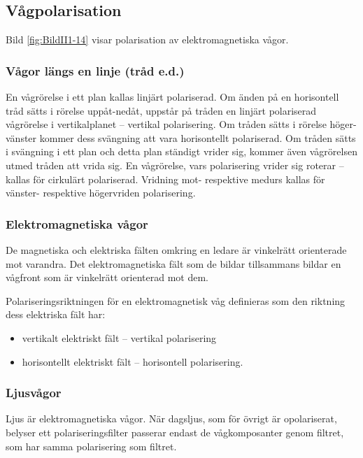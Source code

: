 {{{\subsection{Vågpolarisation}
\label{vågpolarisation}


Bild \ref{fig:BildII1-14} visar polarisation av elektromagnetiska vågor.

\subsubsection{Vågor längs en linje (tråd e.d.)}
En vågrörelse i ett plan kallas linjärt polariserad.
Om änden på en horisontell tråd sätts i rörelse uppåt-nedåt, uppstår på tråden
en linjärt polariserad vågrörelse i vertikalplanet -- vertikal polarisering.
Om tråden sätts i rörelse höger-vänster kommer dess svängning att vara
horisontellt polariserad.
Om tråden sätts i svängning i ett plan och detta plan ständigt vrider sig,
kommer även vågrörelsen utmed tråden att vrida sig.
En vågrörelse, vars polarisering vrider sig roterar -- kallas för cirkulärt
polariserad.
Vridning mot- respektive medurs kallas för vänster- respektive högervriden
polarisering.

\subsubsection{Elektromagnetiska vågor}

De magnetiska och elektriska fälten omkring en ledare är vinkelrätt orienterade
mot varandra.
Det elektromagnetiska fält som de bildar tillsammans bildar en vågfront som
är vinkelrätt orienterad mot dem.

Polariseringsriktningen för en elektromagnetisk våg definieras som den riktning
dess elektriska fält har:
\begin{itemize}
  \item vertikalt elektriskt fält -- vertikal polarisering
  \item horisontellt elektriskt fält -- horisontell polarisering.
\end{itemize}

\subsubsection{Ljusvågor}

Ljus är elektromagnetiska vågor.
När dagsljus, som för övrigt är opolariserat, belyser ett polariseringsfilter
passerar endast de vågkomposanter genom filtret, som har samma polarisering
som filtret.

}}}
